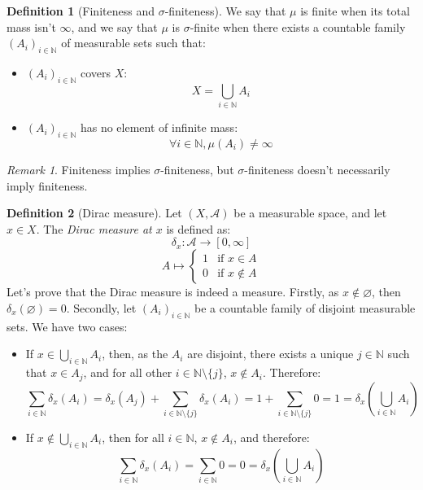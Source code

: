 \documentclass{article}
\theoremstyle{definition}
\newtheorem{definition}{Definition}[section]
\theoremstyle{remark}
\newtheorem*{remark}{Remark}
\theoremstyle{example}
\theoremstyle{notation}
\theoremstyle{axiom}
\newcommand{\tif}{\text{if }}
\begin{document}
\begin{definition}[Finiteness and $\sigma$-finiteness]
    We say that $\mu$ is finite when its total mass isn't $\infty$, and we say that $\mu$ is $\sigma$-finite when there exists a countable family $(A_i)_{i \in \mathbb{N}}$ of measurable sets such that:
    \begin{itemize}
        \item $(A_i)_{i \in \mathbb{N}}$ covers $X$:
            $$X = \bigcup_{i \in \mathbb{N}} A_i$$
        \item $(A_i)_{i \in \mathbb{N}}$ has no element of infinite mass:
            $$\forall i \in \mathbb{N}, \mu(A_i) \neq \infty$$
    \end{itemize}
\end{definition}

\begin{remark}
    Finiteness implies $\sigma$-finiteness, but $\sigma$-finiteness doesn't necessarily imply finiteness.
\end{remark}

\begin{definition}[Dirac measure]
    Let $(X, \mathcal{A})$ be a measurable space, and let $x \in X$. The \textit{Dirac measure at $x$} is defined as:
        $$\delta_x : \mathcal{A} \rightarrow [0, \infty]$$
        $$A \mapsto \begin{cases} 1 & \tif x \in A\\ 0 & \tif x \notin A\end{cases}$$
    Let's prove that the Dirac measure is indeed a measure. Firstly, as $x \notin \varnothing$, then $\delta_x(\varnothing) = 0$. Secondly, let $(A_i)_{i \in \mathbb{N}}$ be a countable family of disjoint measurable sets. We have two cases:
    \begin{itemize}
        \item If $x \in \bigcup_{i \in \mathbb{N}} A_i$, then, as the $A_i$ are disjoint, there exists a unique $j \in \mathbb{N}$ such that $x \in A_j$, and for all other $i \in \mathbb{N} \setminus \{j\}$, $x \notin A_i$. Therefore:
            $$\sum_{i \in \mathbb{N}} \delta_x(A_i) = \delta_x(A_j) + \sum_{i \in \mathbb{N} \setminus \{j\}} \delta_x(A_i) = 1 + \sum_{i \in \mathbb{N} \setminus \{j\}} 0 = 1 = \delta_x(\bigcup_{i \in \mathbb{N}} A_i)$$
        \item If $x \notin \bigcup_{i \in \mathbb{N}} A_i$, then for all $i \in \mathbb{N}$, $x \notin A_i$, and therefore:
        $$\sum_{i \in \mathbb{N}} \delta_x(A_i) = \sum_{i \in \mathbb{N}} 0 = 0 = \delta_x(\bigcup_{i \in \mathbb{N}} A_i)$$
    \end{itemize}
\end{definition}
\end{document}
